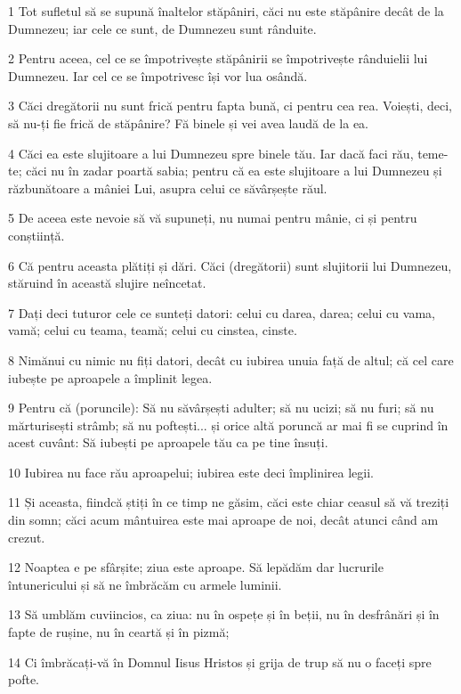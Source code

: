 \par 1 Tot sufletul să se supună înaltelor stăpâniri, căci nu este stăpânire decât de la Dumnezeu; iar cele ce sunt, de Dumnezeu sunt rânduite.
\par 2 Pentru aceea, cel ce se împotrivește stăpânirii se împotrivește rânduielii lui Dumnezeu. Iar cel ce se împotrivesc își vor lua osândă.
\par 3 Căci dregătorii nu sunt frică pentru fapta bună, ci pentru cea rea. Voiești, deci, să nu-ți fie frică de stăpânire? Fă binele și vei avea laudă de la ea.
\par 4 Căci ea este slujitoare a lui Dumnezeu spre binele tău. Iar dacă faci rău, teme-te; căci nu în zadar poartă sabia; pentru că ea este slujitoare a lui Dumnezeu și răzbunătoare a mâniei Lui, asupra celui ce săvârșește răul.
\par 5 De aceea este nevoie să vă supuneți, nu numai pentru mânie, ci și pentru conștiință.
\par 6 Că pentru aceasta plătiți și dări. Căci (dregătorii) sunt slujitorii lui Dumnezeu, stăruind în această slujire neîncetat.
\par 7 Dați deci tuturor cele ce sunteți datori: celui cu darea, darea; celui cu vama, vamă; celui cu teama, teamă; celui cu cinstea, cinste.
\par 8 Nimănui cu nimic nu fiți datori, decât cu iubirea unuia față de altul; că cel care iubește pe aproapele a împlinit legea.
\par 9 Pentru că (poruncile): Să nu săvârșești adulter; să nu ucizi; să nu furi; să nu mărturisești strâmb; să nu poftești... și orice altă poruncă ar mai fi se cuprind în acest cuvânt: Să iubești pe aproapele tău ca pe tine însuți.
\par 10 Iubirea nu face rău aproapelui; iubirea este deci împlinirea legii.
\par 11 Și aceasta, fiindcă știți în ce timp ne găsim, căci este chiar ceasul să vă treziți din somn; căci acum mântuirea este mai aproape de noi, decât atunci când am crezut.
\par 12 Noaptea e pe sfârșite; ziua este aproape. Să lepădăm dar lucrurile întunericului și să ne îmbrăcăm cu armele luminii.
\par 13 Să umblăm cuviincios, ca ziua: nu în ospețe și în beții, nu în desfrânări și în fapte de rușine, nu în ceartă și în pizmă;
\par 14 Ci îmbrăcați-vă în Domnul Iisus Hristos și grija de trup să nu o faceți spre pofte.

